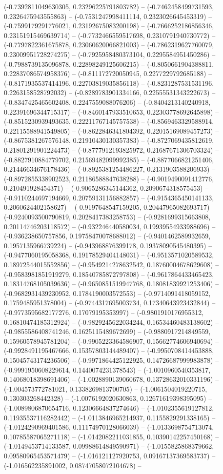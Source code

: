(-0.7392811049630305, 0.23296225791803782) -- (-0.7462458499731593, 0.2326475943555863) -- (-0.7531247998411114, 0.2323026645453319) -- (-0.7599179291776021, 0.23192675083200198) -- (-0.7666252186856346, 0.23151915469639714) -- (-0.7732466559517698, 0.2310791940730772) -- (-0.7797822361675878, 0.23060620066821003) -- (-0.7862319627760079, 0.23009951728274275) -- (-0.7925958480373104, 0.2295584951450286) -- (-0.7988739135096878, 0.22898249125606215) -- (-0.8050661904388811, 0.22837086574958376) -- (-0.811172720050945, 0.2277229792685188) -- (-0.8171935537414196, 0.22703819035856118) -- (-0.8231287531531196, 0.2263158528792032) -- (-0.8289783901334166, 0.22555531343222673) -- (-0.8347425465602408, 0.2247559088076206) -- (-0.8404213140240918, 0.22391696344715317) -- (-0.8460147933510653, 0.22303778692645898) -- (-0.8515230939493635, 0.22211767145757538) -- (-0.8569463329588914, 0.22115588941549805) -- (-0.8622846341804392, 0.22015169089457273) -- (-0.8675381267576148, 0.21910430130357383) -- (-0.8727069435812619, 0.21801291901224473) -- (-0.8777912193825972, 0.21687671306703324) -- (-0.8827910884779702, 0.21569482099992385) -- (-0.8877066821251406, 0.21446634676178436) -- (-0.8925381254486227, 0.2131903588206933) -- (-0.8972855338902523, 0.21186588847638288) -- (-0.9019490091412776, 0.210491928454371) -- (-0.9065286345144362, 0.2090674318575453) -- (-0.9110244697194669, 0.20759131156882857) -- (-0.9154365450141133, 0.2060624402158627) -- (-0.9197648547159205, 0.20447965082693717) -- (-0.9240093500790819, 0.2028417383258753) -- (-0.9281699315663808, 0.20114746203118572) -- (-0.932246440580034, 0.19939554933988696) -- (-0.936238650757856, 0.19758470078688012) -- (-0.9401462589932659, 0.1957135966739224) -- (-0.943968876399178, 0.19378090545480395) -- (-0.9477060195058368, 0.19178529404148031) -- (-0.9513571020589532, 0.18972544015552856) -- (-0.9549214278632542, 0.18760004678629608) -- (-0.9583981851919279, 0.18540785872797808) -- (-0.9617864433465423, 0.18314768105039636) -- (-0.9650851519947768, 0.18081839921253406) -- (-0.9682931439230952, 0.1784190003572553) -- (-0.9714091418059152, 0.1759485951378004) -- (-0.9744317695003734, 0.17340643923432844) -- (-0.9773595682177276, 0.17079195353997) -- (-0.9801910176955312, 0.16810474185312924) -- (-0.9829245622034244, 0.16534460483138602) -- (-0.9855586408741246, 0.1625115489672699) -- (-0.9880917214849559, 0.15960578945781204) -- (-0.9905223364586907, 0.15662774606940694) -- (-0.9928491195467666, 0.15357803144489407) -- (-0.9950708414453888, 0.15045743174236506) -- (-0.9971864425122925, 0.14726687999983878) -- (-0.9991950608229614, 0.1440074231378543) -- (-1.0010960540353817, 0.14068018398691406) -- (-1.0028890139060678, 0.13728632010331196) -- (-1.004573772781021, 0.1338269813700705) -- (-1.0061504019220715, 0.130303268442328) -- (-1.0076192020630863, 0.12671619398395095) -- (-1.0089806870654716, 0.12306664837274646) -- (-1.0102355619127812, 0.11935537116282442) -- (-1.0113846965214937, 0.1155829291338165) -- (-1.0124290969401586, 0.11174970128066039) -- (-1.0133698754713074, 0.10785587065271118) -- (-1.0142082211031855, 0.10390142257450168) -- (-1.0149453714133587, 0.09988614849590971) -- (-1.0155825868379662, 0.09580965453571479) -- (-1.016121127920753, 0.09167137369583737) -- (-1.016562235891002, 0.08747058072104678) -- 